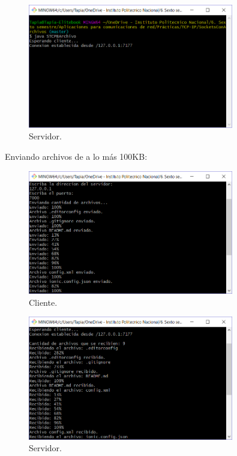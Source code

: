 \documentclass[12pt,twoside]{article}
\begin{document}
\begin{figure}[h]
	\centering
	\includegraphics[width=0.8\textwidth]{img/Servidor.png}
	\caption{Servidor.}
\end{figure}

\newpage

Enviando archivos de a lo m\'as 100KB:
\begin{figure}[h]
	\centering
	\includegraphics[width=0.8\textwidth]{img/Cliente1.png}
	\caption{Cliente.}
\end{figure}

\begin{figure}[h]
	\centering
	\includegraphics[width=0.8\textwidth]{img/Servidor1.png}
	\caption{Servidor.}
\end{figure}
\end{document}
